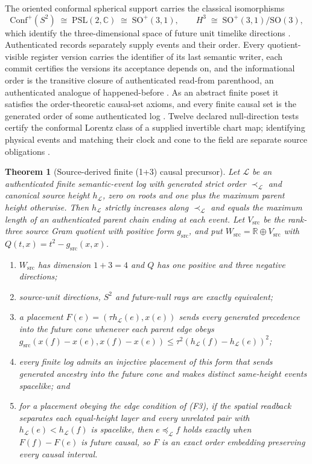 \documentclass[11pt]{article}
\newtheorem{theorem}{Theorem}[section]
\theoremstyle{definition}
\theoremstyle{remark}
\begin{document}
The oriented conformal spherical support carries the classical isomorphisms
\begin{equation}
\mathrm{Conf}^{+}(S^{2})\;\cong\;\mathrm{PSL}(2,\mathbb C)\;\cong\;
\mathrm{SO}^{+}(3,1),
\qquad
H^{3}\;\cong\;\mathrm{SO}^{+}(3,1)/\mathrm{SO}(3),
\label{eq:lorentz}
\end{equation}
which identify the three-dimensional space of future unit timelike
directions \cite{ratcliffe2019}. Authenticated records separately supply
events and their order. Every quotient-visible register version carries the
identifier of its last semantic writer, each commit certifies the versions
its acceptance depends on, and the informational order is the transitive
closure of authenticated read-from parenthood, an authenticated analogue of
happened-before \cite{lamport1978}. As an abstract finite poset it satisfies
the order-theoretic causal-set axioms, and every finite causal set is the
generated order of some authenticated log \cite{ophrepo}.
Twelve declared null-direction tests certify the conformal Lorentz class of a supplied
invertible chart map; identifying physical events and matching their
clock and cone to the field are separate source obligations \cite{ophobservers,ophEinstein}.

\begin{theorem}[Source-derived finite (1+3) causal precursor]
\label{thm:source-causal-precursor}
Let $\mathcal L$ be an authenticated finite semantic-event log with generated strict
order $\prec_{\mathcal L}$ and canonical source height $h_{\mathcal L}$, zero on roots and one
plus the maximum parent height otherwise. Then $h_{\mathcal L}$ strictly increases along
$\prec_{\mathcal L}$ and equals the maximum length of an authenticated parent chain
ending at each event. Let $V_{\mathrm{src}}$ be the rank-three source Gram
quotient with positive form $g_{\mathrm{src}}$, and put
$W_{\mathrm{src}}=\mathbb R\oplus V_{\mathrm{src}}$ with
$Q(t,x)=t^2-g_{\mathrm{src}}(x,x)$.
\begin{enumerate}[label=(F\arabic*),leftmargin=2.4em]
\item $W_{\mathrm{src}}$ has dimension $1+3=4$ and $Q$ has one positive and
three negative directions;
\item source-unit directions, $S^2$ and future-null rays are exactly
equivalent;
\item a placement $F(e)=(\tau h_{\mathcal L}(e),x(e))$ sends every generated precedence
into the future cone whenever each parent edge obeys
$g_{\mathrm{src}}(x(f)-x(e),x(f)-x(e))\leq\tau^2(h_{\mathcal L}(f)-h_{\mathcal L}(e))^2$;
\item every finite log admits an injective placement of this form that sends
generated ancestry into the future cone and makes distinct same-height events
spacelike; and
\item for a placement obeying the edge condition of (F3), if the spatial
readback separates each equal-height layer and every unrelated pair with
$h_{\mathcal L}(e)<h_{\mathcal L}(f)$ is spacelike, then $e\preceq_{\mathcal L} f$ holds
exactly when $F(f)-F(e)$ is future causal, so $F$ is an exact order
embedding preserving every causal interval.
\end{enumerate}
\end{theorem}
\end{document}
